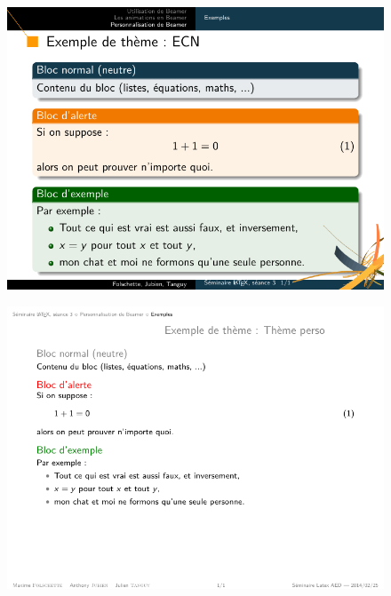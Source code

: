 \begin{frame}[plain]
\begin{figure}
  \centering
  \includegraphics[width=1\textwidth]{img/seance3_extheme_ecn}
\end{figure}
\end{frame}



\begin{frame}[plain]
\begin{figure}
  \centering
  \includegraphics[width=1\textwidth]{img/seance3_extheme_perso}
\end{figure}
\end{frame}



